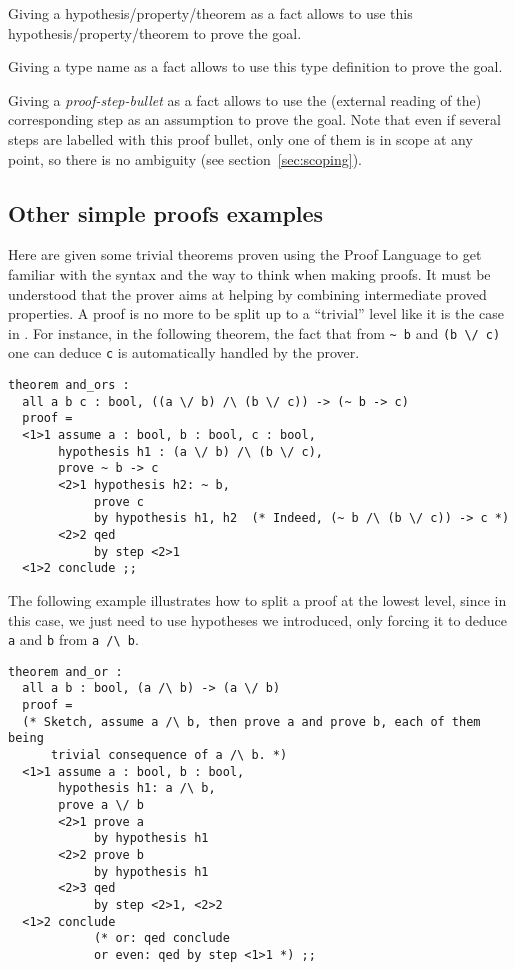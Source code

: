 Giving a hypothesis/property/theorem as a fact allows {\zenon} to use
this hypothesis/property/theorem to prove the goal.

Giving a type name as a fact allows {\zenon} to use this type definition to
prove the goal.

Giving a {\em proof-step-bullet} as a fact allows {\zenon} to use the
(external reading of the) corresponding step as an assumption to prove the
goal. Note that even if several steps are labelled with this proof bullet,
only one of them is in scope at any point, so there is no ambiguity (see
section~\ref{sec:scoping}).


\subsection{Other simple proofs examples}

Here are given some trivial theorems proven using the {\focal} Proof
Language to get familiar with the syntax and the way to think when
making proofs. It must be understood that the prover aims at helping by
combining intermediate proved properties. A proof is no more to be
split up to a ``trivial'' level like it is the case in {\coq}. For
instance, in the following theorem, the fact that from \verb"~ b" and
\verb"(b \/ c)" one can deduce \verb"c" is automatically handled by
the prover.

{\scriptsize
\begin{lstlisting}
theorem and_ors :
  all a b c : bool, ((a \/ b) /\ (b \/ c)) -> (~ b -> c)
  proof =
  <1>1 assume a : bool, b : bool, c : bool,
       hypothesis h1 : (a \/ b) /\ (b \/ c),
       prove ~ b -> c
       <2>1 hypothesis h2: ~ b,
            prove c
            by hypothesis h1, h2  (* Indeed, (~ b /\ (b \/ c)) -> c *)
       <2>2 qed
            by step <2>1
  <1>2 conclude ;;
\end{lstlisting}}

The following example illustrates how to split a proof at the lowest
level, since in this case, we just need {\zenon} to use hypotheses we
introduced, only forcing it to deduce \verb"a" and \verb"b" from
\verb"a /\ b".

{\scriptsize
\begin{lstlisting}
theorem and_or :
  all a b : bool, (a /\ b) -> (a \/ b)
  proof =
  (* Sketch, assume a /\ b, then prove a and prove b, each of them being
      trivial consequence of a /\ b. *)
  <1>1 assume a : bool, b : bool,
       hypothesis h1: a /\ b,
       prove a \/ b
       <2>1 prove a
            by hypothesis h1
       <2>2 prove b
            by hypothesis h1
       <2>3 qed
            by step <2>1, <2>2
  <1>2 conclude
            (* or: qed conclude
            or even: qed by step <1>1 *) ;;
\end{lstlisting}}

